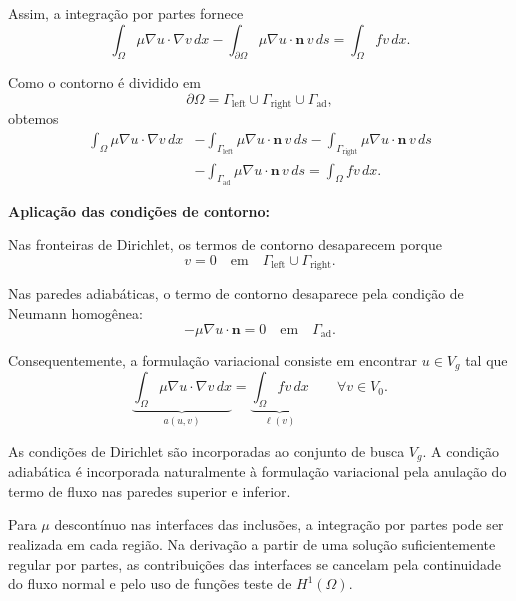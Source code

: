 \documentclass{article}
\begin{document}
Assim, a integração por partes fornece
\begin{equation*}
	\int_\Omega
	\mu\nabla u\cdot\nabla v\,dx
	-
	\int_{\partial\Omega}
	\mu\nabla u\cdot\mathbf{n}\,v\,ds
	=
	\int_\Omega fv\,dx.
\end{equation*}

Como o contorno é dividido em
\begin{equation*}
	\partial\Omega
	=
	\Gamma_{\mathrm{left}}
	\cup
	\Gamma_{\mathrm{right}}
	\cup
	\Gamma_{\mathrm{ad}},
\end{equation*}
obtemos
\begin{equation*}
	\begin{aligned}
		\int_\Omega \mu\nabla u\cdot\nabla v\,dx
		&-
		\int_{\Gamma_{\mathrm{left}}}
		\mu\nabla u\cdot\mathbf{n}\,v\,ds
		-
		\int_{\Gamma_{\mathrm{right}}}
		\mu\nabla u\cdot\mathbf{n}\,v\,ds
		\\
		&-
		\int_{\Gamma_{\mathrm{ad}}}
		\mu\nabla u\cdot\mathbf{n}\,v\,ds
		=
		\int_\Omega fv\,dx.
	\end{aligned}
\end{equation*}

\noindent \textbf{Aplicação das condições de contorno:}

Nas fronteiras de Dirichlet, os termos de contorno desaparecem porque
\begin{equation*}
	v=0
	\quad\text{em}\quad
	\Gamma_{\mathrm{left}}\cup\Gamma_{\mathrm{right}}.
\end{equation*}

Nas paredes adiabáticas, o termo de contorno desaparece pela condição
de Neumann homogênea:
\begin{equation*}
	-\mu\nabla u\cdot\mathbf{n}=0
	\quad\text{em}\quad
	\Gamma_{\mathrm{ad}}.
\end{equation*}

Consequentemente, a formulação variacional consiste em encontrar
$u\in V_g$ tal que
\begin{equation}
	\underbrace{
		\int_\Omega \mu\nabla u\cdot\nabla v\,dx
	}_{a(u,v)}
	=
	\underbrace{
		\int_\Omega fv\,dx
	}_{\ell(v)}
	\qquad\forall v\in V_0.
	\label{eq:poisson-variacional}
\end{equation}

As condições de Dirichlet são incorporadas ao conjunto de busca
$V_g$. A condição adiabática é incorporada naturalmente à formulação
variacional pela anulação do termo de fluxo nas paredes superior
e inferior.

Para $\mu$ descontínuo nas interfaces das inclusões, a integração
por partes pode ser realizada em cada região. Na derivação a partir
de uma solução suficientemente regular por partes, as contribuições
das interfaces se cancelam pela continuidade do fluxo normal e
pelo uso de funções teste de $H^1(\Omega)$.
\end{document}
